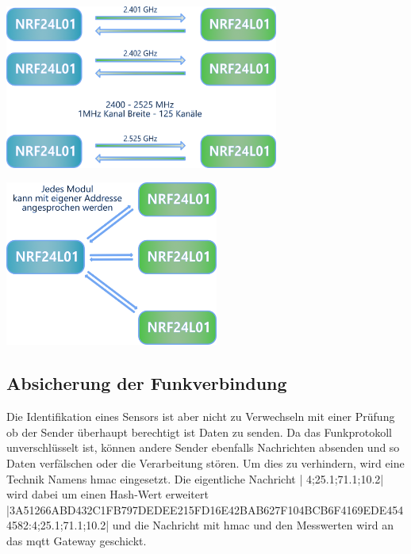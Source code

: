 \documentclass[
  12pt, %
  a4paper, %
  twoside, %
  openany, %
  numbers=noenddot, %
  BCOR=5mm, %
  parskip=half*, %
  thesis, %
]{bfhbook}
\begin{document}
\begin{center}
    \begin{minipage}[b]{0.45\textwidth}
        \centering
        \includegraphics[width=9cm]{Bilder/NRF24Kommunikation.png}
        \captionsetup{justification=centering}
    \end{minipage}\hfill
    \begin{minipage}[b]{0.45\textwidth}
        \centering
        \includegraphics[width=7cm]{Bilder/NRF24Kommunikation-2.png} %
        \captionsetup{justification=centering}
    \end{minipage}
\end{center}
\subsection{Absicherung der Funkverbindung}\label{funkAbsicherung}
Die Identifikation eines Sensors ist aber nicht zu Verwechseln mit einer Prüfung ob der Sender überhaupt berechtigt ist Daten zu senden. Da das Funkprotokoll unverschlüsselt ist, können andere Sender ebenfalls Nachrichten absenden und so Daten verfälschen oder die Verarbeitung stören. Um dies zu verhindern, wird eine Technik Namens \Gls{hmac} eingesetzt.
Die eigentliche Nachricht | 4;25.1;71.1;10.2| wird dabei um einen Hash-Wert erweitert
|3A51266ABD432C1FB797DEDEE215FD16E42BAB627F104BCB6F4169EDE4544582:4;25.1;71.1;10.2| und die Nachricht mit \Gls{hmac} und den Messwerten wird an das \Gls{mqtt} Gateway geschickt.
\end{document}
